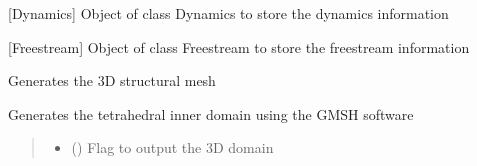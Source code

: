 \documentclass[letterpaper,10pt,english]{sphinxmanual}
\begin{document}
\begin{fulllineitems}

\begin{fulllineitems}
\label{\detokenize{modules:assembly.Assembly.dynamics}}
\pysigstartsignatures
{}
\pysigstopsignatures
\sphinxAtStartPar
{[}Dynamics{]} Object of class Dynamics to store the dynamics information

\end{fulllineitems}


\begin{fulllineitems}
\label{\detokenize{modules:assembly.Assembly.freestream}}
\pysigstartsignatures
{}
\pysigstopsignatures
\sphinxAtStartPar
{[}Freestream{]} Object of class Freestream to store the freestream information

\end{fulllineitems}


\begin{fulllineitems}
\label{\detokenize{modules:assembly.Assembly.generate_inner_domain}}
\pysigstartsignatures
{}
\pysigstopsignatures
\sphinxAtStartPar
Generates the 3D structural mesh

\sphinxAtStartPar
Generates the tetrahedral inner domain using the GMSH software
\begin{quote}\begin{description}
\begin{itemize}
\item {} 
\sphinxAtStartPar
{} () \textendash{} Flag to output the 3D domain


\end{itemize}
\end{description}
\end{quote}
\end{fulllineitems}
\end{fulllineitems}
\end{document}
